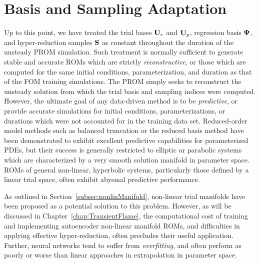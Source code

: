 \section{Basis and Sampling Adaptation}\label{sec:adaptation}

Up to this point, we have treated the trial bases $\consTrial$ and $\primTrial$, regression basis $\deimBasis$, and hyper-reduction samples $\mathbf{S}$ as constant throughout the duration of the unsteady PROM simulation. Such treatment is normally sufficient to generate stable and accurate ROMs which are strictly \textit{reconstructive}, or those which are computed for the same initial conditions, parameterization, and duration as that of the FOM training simulations. The PROM simply seeks to reconstruct the unsteady solution from which the trial basis and sampling indices were computed. However, the ultimate goal of any data-driven method is to be \textit{predictive}, or provide accurate simulations for initial conditions, parameterizations, or durations which were not accounted for in the training data set. Reduced-order model methods such as balanced truncation or the reduced basis method have been demonstrated to exhibit excellent predictive capabilities for parameterized PDEs, but their success is generally restricted to elliptic or parabolic systems which are characterized by a very smooth solution manifold in parameter space. ROMs of general non-linear, hyperbolic systems, particularly those defined by a linear trial space, often exhibit abysmal predictive performance.

As outlined in Section~\ref{subsec:nonlinManifold}, non-linear trial manifolds have been proposed as a potential solution to this problem. However, as will be discussed in Chapter~\ref{chap:TransientFlame}, the computational cost of training and implementing autoencoder non-linear manifold ROMs, and difficulties in applying effective hyper-reduction, often precludes their useful application. Further, neural networks tend to suffer from \textit{overfitting}, and often perform as poorly or worse than linear approaches in extrapolation in parameter space.

